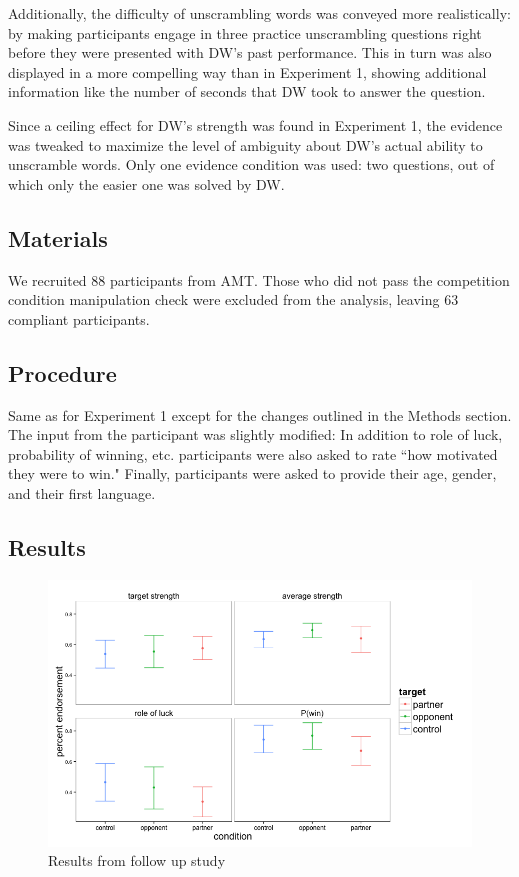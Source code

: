 \documentclass{article}
\begin{document}
Additionally, the difficulty of unscrambling words was conveyed more realistically: by making participants engage in three practice unscrambling questions right before they were presented with DW's past performance. This in turn was also displayed in a more compelling way than in Experiment 1, showing additional information like the number of seconds that DW took to answer the question.

Since a ceiling effect for DW's strength was found in Experiment 1, the evidence was tweaked to maximize the level of ambiguity about DW's actual ability to unscramble words. Only one evidence condition was used: two questions, out of which only the easier one was solved by DW.

\subsection{Materials}

We recruited 88 participants from AMT. Those who did not pass the competition condition manipulation check were excluded from the analysis, leaving 63 compliant participants.

\subsection{Procedure}

Same as for Experiment 1 except for the changes outlined in the Methods section. The input from the participant was slightly modified: In addition to role of luck, probability of winning, etc. participants were also asked to rate ``how motivated they were to win." Finally, participants were asked to provide their age, gender, and their first language. 

\subsection{Results}


\begin{figure}
\centering
    \includegraphics[width=\columnwidth]{motiv2_facet-Question_n48}
    \caption{Results from follow up study}
      \label{fig:motiv2}
\end{figure}
\end{document}
